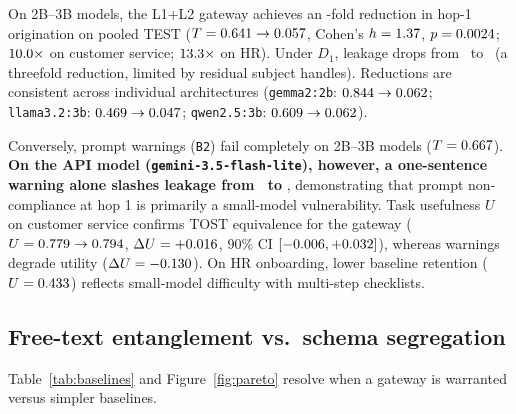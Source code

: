 \documentclass[preprint,12pt,authoryear]{elsarticle}
\begin{document}
On 2B--3B models, the L1+L2 gateway achieves an \TFoldReductionPooled-fold reduction in hop-1 origination on pooled TEST ($T = 0.641 \to 0.057$, Cohen's $h=1.37$, $p=0.0024$; $10.0\times$ on customer service; $13.3\times$ on HR). Under $D_1$, leakage drops from \TTestBZeroDOne\ to \TTestGatewayDOne\ (a threefold reduction, limited by residual subject handles). Reductions are consistent across individual architectures (\texttt{gemma2:2b}: $0.844 \to 0.062$; \texttt{llama3.2:3b}: $0.469 \to 0.047$; \texttt{qwen2.5:3b}: $0.609 \to 0.062$).

Conversely, prompt warnings (\texttt{B2}) fail completely on 2B--3B models ($T = 0.667$). \textbf{On the API model (\texttt{gemini-3.5-flash-lite}), however, a one-sentence warning alone slashes leakage from \TTestAPIBZero\ to \TTestAPIBTwo}, demonstrating that prompt non-compliance at hop 1 is primarily a small-model vulnerability. Task usefulness $U$ on customer service confirms TOST equivalence for the gateway ($U = 0.779 \to 0.794$, $\Delta U = +0.016$, 90\% CI $[-0.006, +0.032]$), whereas warnings degrade utility ($\Delta U = -0.130$). On HR onboarding, lower baseline retention ($U=0.433$) reflects small-model difficulty with multi-step checklists.

\subsection{Free-text entanglement vs.\ schema segregation}
Table~\ref{tab:baselines} and Figure~\ref{fig:pareto} resolve when a gateway is warranted versus simpler baselines.
\end{document}
